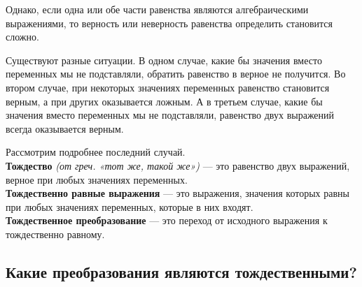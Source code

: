\documentclass[12pt, a4paper]{article}
\begin{document}
	Однако, если одна или обе части равенства являются алгебраическими выражениями, то верность или неверность равенства определить становится сложно.
	
	Существуют разные ситуации. В одном случае, какие бы значения вместо переменных мы не подставляли, обратить равенство в верное не получится. Во втором случае, при некоторых значениях переменных равенство становится верным, а при других оказывается ложным. А в третьем случае, какие бы значения вместо переменных мы не подставляли, равенство двух выражений всегда оказывается верным.
	
	Рассмотрим подробнее последний случай.\\
	
	\textbf{Тождество} \textit{(от греч. «тот же, такой же»)} — это равенство двух выражений, верное при любых значениях переменных.\\
	
	\textbf{Тождественно равные выражения} — это выражения, значения которых равны при любых значениях переменных, которые в них входят.\\

	\textbf{Тождественное преобразование} — это переход от исходного выражения к тождественно равному.
	
	\subsection*{Какие преобразования являются тождественными?}
	
\end{document}
